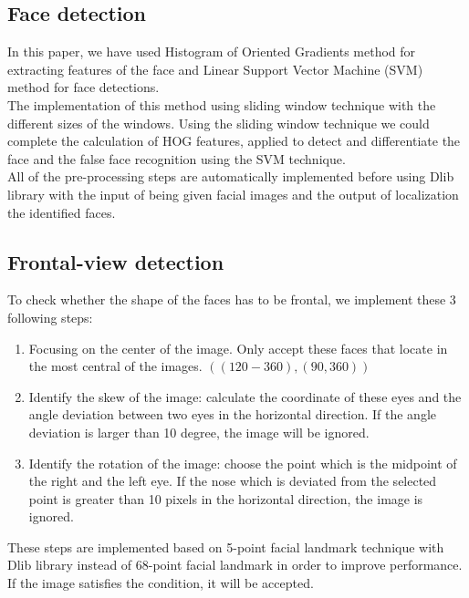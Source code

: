 \documentclass[journal, twocolumn]{IEEEtran}
\begin{document}
\subsection{Face detection}
\label{face-detection}

In this paper, we have used Histogram of Oriented Gradients method for extracting features of the face and Linear Support Vector Machine (SVM) method for face detections.\\
The implementation of this method using sliding window technique with the different sizes of the windows. Using the sliding window technique we could complete the calculation of HOG features, applied to detect and differentiate the face and the false face recognition using the SVM technique.\\
All of the pre-processing steps are automatically implemented before using Dlib library with the input of being given facial images and the output of localization the identified faces.\\


\subsection{Frontal-view detection}
\label{frontal-view-detection}

To check whether the shape of the faces has to be frontal, we implement these 3 following steps:
\begin{enumerate}[Step 1.]
	\item Focusing on the center of the image. Only accept these faces that locate in the most central of the images. $((120-360), (90,360))$
	\item Identify the skew of the image: calculate the coordinate of these eyes and the angle deviation between two eyes in the horizontal direction. If the angle deviation is larger than 10 degree, the image will be ignored.
	\item Identify the rotation of the image: choose the point which is the midpoint of the right and the left eye. If the nose which is deviated from the selected point is greater than 10 pixels in the horizontal direction, the image is ignored.
\end{enumerate}
These steps are implemented based on 5-point facial landmark technique with Dlib library instead of 68-point facial landmark in order to improve performance. If the image satisfies the condition, it will be accepted.
\end{document}
